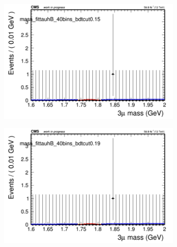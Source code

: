 \begin{figure}[H]
\begin{subfigure}{0.2\textwidth}
        \caption{}
    \end{subfigure}
    \begin{subfigure}{0.2\textwidth}
        \includegraphics[width=\textwidth]{unfixed_exp/plots/tauhB/massfit_tauhB_40bins_bdtcut0.15.png}
        \caption{}
    \end{subfigure}
    \begin{subfigure}{0.2\textwidth}
        \includegraphics[width=\textwidth]{unfixed_exp/plots/tauhB/massfit_tauhB_40bins_bdtcut0.19.png}
        \caption{}
    \end{subfigure}
    \begin{subfigure}{0.2\textwidth}

\end{subfigure}
\end{figure}
